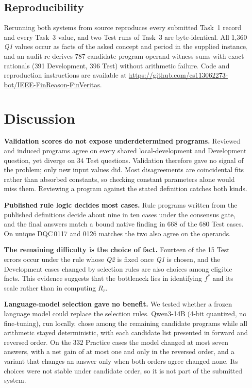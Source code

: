 \documentclass[conference]{IEEEtran}
\newcommand{\DQC}[1]{DQC\,#1}
\newcommand{\QA}{\textit{Q1}}
\newcommand{\QB}{\textit{Q2}}
\begin{document}
\subsection{Reproducibility}
Rerunning both systems from source reproduces every submitted Task~1 record and every Task~3 value, and two Test runs of Task~3 are byte-identical. All 1,360 \QA{} values occur as facts of the asked concept and period in the supplied instance, and an audit re-derives 787 candidate-program operand-witness sums with exact rationals (391 Development, 396 Test) without arithmetic failure. Code and reproduction instructions are available at \url{https://github.com/cs113062273-bot/IEEE-FinReason-FinVeritas}.

\section{Discussion}
\textbf{Validation scores do not expose underdetermined programs.} Reviewed and induced programs agree on every shared local-development and Development question, yet diverge on 34 Test questions. Validation therefore gave no signal of the problem; only new input values did. Most disagreements are coincidental fits rather than absorbed constants, so checking constant parameters alone would miss them. Reviewing a program against the stated definition catches both kinds.

\textbf{Published rule logic decides most cases.} Rule programs written from the published definitions decide about nine in ten cases under the consensus gate, and the final answers match a bound native finding in 668 of the 680 Test cases. On unique \DQC{0117} and 0126 matches the two also agree on the operands.

\textbf{The remaining difficulty is the choice of fact.} Fourteen of the 15 Test errors occur under the rule whose \QB{} is fixed once \QA{} is chosen, and the Development cases changed by selection rules are also choices among eligible facts. This evidence suggests that the bottleneck lies in identifying $f^*$ and its scale rather than in computing $R_r$.

\textbf{Language-model selection gave no benefit.} We tested whether a frozen language model could replace the selection rules. Qwen3-14B (4-bit quantized, no fine-tuning), run locally, chose among the remaining candidate programs while all arithmetic stayed deterministic, with each candidate list presented in forward and reversed order. On the 332 Practice cases the model changed at most seven answers, with a net gain of at most one and only in the reversed order, and a variant that changes an answer only when both orders agree changed none. Its choices were not stable under candidate order, so it is not part of the submitted system.
\end{document}
